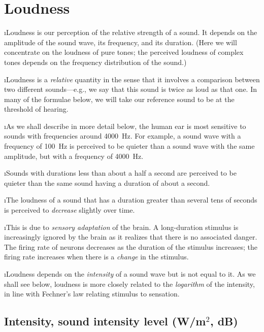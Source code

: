 \section{Loudness}

\bi

\i Loudness is our perception of the relative 
strength of a sound.
It depends on the amplitude of the sound wave,
its frequency, and its duration.
(Here we will concentrate on the loudness of pure tones;
the perceived loudness of complex tones depends on the
frequency distribution of the sound.)

\i Loudness is a {\em relative} quantity in 
the sense that it involves a comparison between 
two different sounds---e.g., we say that this 
sound is twice as loud as that one.
In many of the formulae below, we will take our 
reference sound to be at the threshold of hearing.

\i As we shall describe in more detail below,
the human ear is most sensitive to sounds
with frequencies around 4000~Hz.
For example, a sound wave with a frequency of
100~Hz is perceived to be quieter than 
a sound wave with the same amplitude, 
but with a frequency of 4000~Hz.

\i Sounds with durations less than about a half
a second are perceived to be quieter than the 
same sound having a duration of about a second.

\i The loudness of a sound that has 
a duration greater than several tens of seconds 
is perceived to {\em decrease} slightly over time.

\i This is due to {\em sensory adaptation} of
the brain.
A long-duration stimulus is increasingly ignored
by the brain as it realizes that there is no 
associated danger.
The firing rate of neurons decreases as the
duration of the stimulus increases;
the firing rate increases when there is a {\em change} 
in the stimulus.

\i Loudness depends on the {\em intensity} of
a sound wave but is not equal to it.
As we shall see below, loudness is more closely
related to the {\em logarithm} of the intensity, 
in line with Fechner's law relating stimulus 
to sensation.

\ei
\subsection{Intensity, sound intensity level (W/m$^2$, dB)}
\bi

